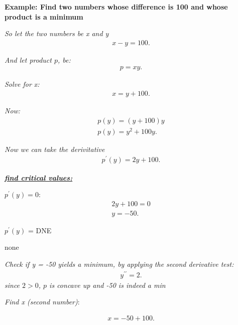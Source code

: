 \documentclass{report}
\begin{document}
  \bigbreak \noindent 
  \begin{mdframed}
    \textbf{Example: Find two numbers whose difference is 100 and whose product is a minimum}
  \end{mdframed}

  \bigbreak \noindent
  \textit{So let the two numbers be x and y}
  \begin{align*}
    x-y=100
  .\end{align*}
  
  \bigbreak \noindent 
  \textit{And let product $p$, be:}
  \begin{align*}
    p = xy
  .\end{align*}

  \bigbreak \noindent 
  \textit{Solve for x:}
  \begin{align*}
    x = y+100
  .\end{align*}

  \bigbreak \noindent 
  \textit{Now:}
  \begin{align*}
    p(y) = (y+100)y \\
    p(y) = y^{2} + 100y
  .\end{align*}

  \bigbreak \noindent 
  \textit{Now we can take the derivitative}
  \begin{align*}
    p^{\prime}(y) =2y+100
  .\end{align*}

  \bigbreak \noindent 
  \textbf{\textit{\underline{find critical values:}}}
  
  \bigbreak \noindent 
  \textit{$p^{\prime}(y)=  0$}:
  \begin{align*}
    2y+100 = 0 \\
    y=  -50
  .\end{align*}

  \bigbreak \noindent 
  \textit{$p^{\prime}(y)$} = DNE
  \begin{center}
    none
  \end{center}

  \pagebreak \bigbreak \noindent
  \textit{Check if y = -50 yields a minimum, by applying the second derivative test:}
  \begin{align*}
    y^{\prime\prime} = 2
  .\end{align*}
  \textit{since $2>0 $, $p$ is concave up and -50 is indeed a min}

  \bigbreak \noindent
  \textit{Find x (second number)}:

  \begin{align*}
    x = -50 + 100    
  .\end{align*}
\end{document}
